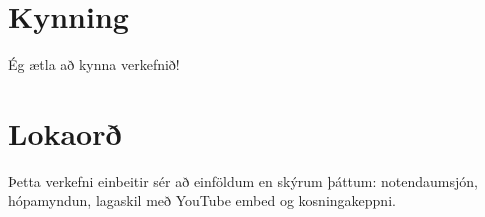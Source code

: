 \documentclass{article}
\begin{document}
\section{Kynning}
Ég ætla að kynna verkefnið!

\section{Lokaorð}
Þetta verkefni einbeitir sér að einföldum en skýrum þáttum: notendaumsjón, hópamyndun, lagaskil með YouTube embed og kosningakeppni. 
\end{document}
